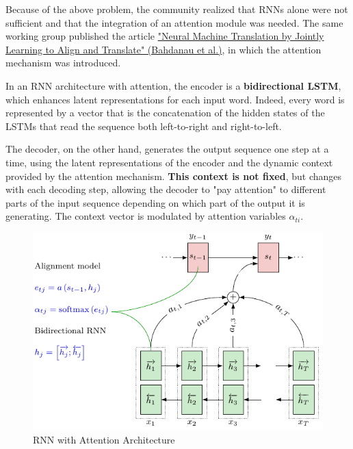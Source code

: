 Because of the above problem, the community realized that RNNs alone were not sufficient and that the integration of an attention module was needed. The same working group published the article \href{https://arxiv.org/pdf/1409.0473}{"Neural Machine Translation by Jointly Learning to Align and Translate" (Bahdanau et al.)}, in which the attention mechanism was introduced. 

In an RNN architecture with attention, the encoder is a \textbf{bidirectional LSTM}, which enhances latent representations for each input word. Indeed, every word is represented by a vector that is the concatenation of the hidden states of the LSTMs that read the sequence both left-to-right and right-to-left.

The decoder, on the other hand, generates the output sequence one step at a time, using the latent representations of the encoder and the dynamic context provided by the attention mechanism. \textbf{This context is not fixed}, but changes with each decoding step, allowing the decoder to "pay attention" to different parts of the input sequence depending on which part of the output it is generating. The context vector is modulated by attention variables $\alpha_{ti}$.

\begin{figure}[!htbp]
    \centering
    \includegraphics[width=0.7\linewidth]{tikz/chapter7 - RNN with Attention.pdf}
    \caption{RNN with Attention Architecture}
\end{figure}


